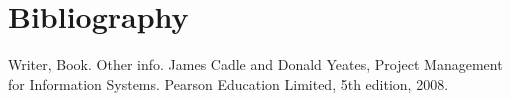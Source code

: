 \section{Bibliography}

\begin{thebibliography}{9}
Writer,
Book. Other info.
James Cadle and Donald Yeates,
Project Management
for Information Systems. Pearson Education Limited, 5th edition, 2008.
\end{thebibliography}
\newpage